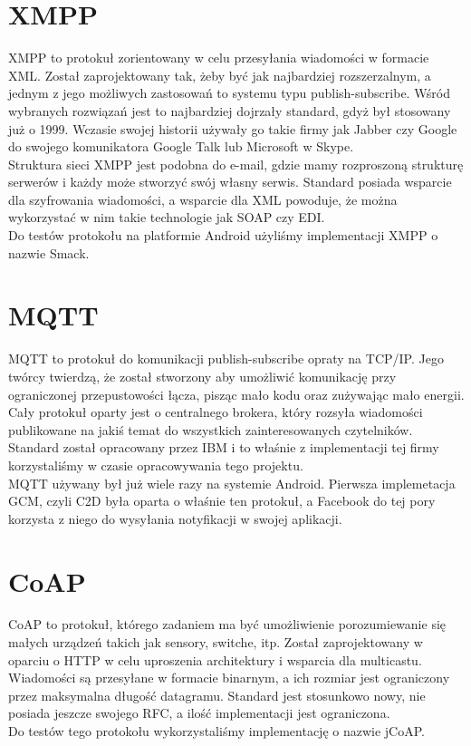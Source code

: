 \documentclass[twoside]{article}
\begin{document}
\begin{multicols}{2}
\section{XMPP}
XMPP to protokuł zorientowany w celu przesyłania wiadomości w formacie XML. Został zaprojektowany tak, żeby być jak najbardziej rozszerzalnym, a jednym z jego możliwych zastosowań to systemu typu publish-subscribe. Wśród wybranych rozwiązań jest to najbardziej dojrzały standard, gdyż był stosowany już o 1999. Wczasie swojej historii używały go takie firmy jak Jabber czy Google do swojego komunikatora Google Talk lub Microsoft w Skype.
\\ Struktura sieci XMPP jest podobna do e-mail, gdzie mamy rozproszoną strukturę serwerów i każdy może stworzyć swój własny serwis. Standard posiada wsparcie dla szyfrowania wiadomości, a wsparcie dla XML powoduje, że można wykorzystać w nim takie technologie jak SOAP czy EDI.
\\ Do testów protokołu na platformie Android użyliśmy implementacji XMPP o nazwie Smack.

\section{MQTT}
MQTT to protokuł do komunikacji publish-subscribe opraty na TCP/IP. Jego twórcy twierdzą, że został stworzony aby umożliwić komunikację przy ograniczonej przepustowości łącza, pisząc mało kodu oraz zużywając mało energii. Cały protokuł oparty jest o centralnego brokera, który rozsyła wiadomości publikowane na jakiś temat do wszystkich zainteresowanych czytelników. Standard został opracowany przez IBM i to właśnie z implementacji tej firmy korzystaliśmy w czasie opracowywania tego projektu.
\\ MQTT używany był już wiele razy na systemie Android. Pierwsza implemetacja GCM, czyli C2D była oparta o właśnie ten protokuł, a Facebook do tej pory korzysta z niego do wysyłania notyfikacji w swojej aplikacji.

\section{CoAP}
CoAP to protokuł, którego zadaniem ma być umożliwienie porozumiewanie się małych urządzeń takich jak sensory, switche, itp. Został zaprojektowany w oparciu o HTTP w celu uproszenia architektury i wsparcia dla multicastu. Wiadomości są przesyłane w formacie binarnym, a ich rozmiar jest ograniczony przez maksymalna długość datagramu. Standard jest stosunkowo nowy, nie posiada jeszcze swojego RFC, a ilość implementacji jest ograniczona.
\\Do testów tego protokołu wykorzystaliśmy implementację o nazwie jCoAP.


\end{multicols}
\end{document}
